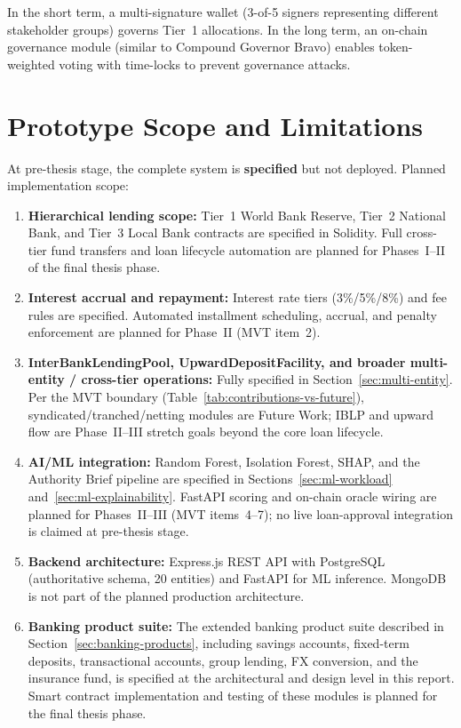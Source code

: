 \documentclass[12pt,a4paper]{report}
\begin{document}
In the short term, a multi-signature wallet (3-of-5 signers representing different stakeholder groups) governs Tier~1 allocations. In the long term, an on-chain governance module (similar to Compound Governor Bravo) enables token-weighted voting with time-locks to prevent governance attacks.

\section{Prototype Scope and Limitations}

At pre-thesis stage, the complete system is \textbf{specified} but not deployed. Planned implementation scope:

\begin{enumerate}[noitemsep]
\item \textbf{Hierarchical lending scope:} Tier~1 World Bank Reserve, Tier~2 National Bank, and Tier~3 Local Bank contracts are specified in Solidity. Full cross-tier fund transfers and loan lifecycle automation are planned for Phases~I--II of the final thesis phase.

\item \textbf{Interest accrual and repayment:} Interest rate tiers (3\%/5\%/8\%) and fee rules are specified. Automated installment scheduling, accrual, and penalty enforcement are planned for Phase~II (MVT item~2).

\item \textbf{InterBankLendingPool, UpwardDepositFacility, and broader multi-entity / cross-tier operations:} Fully specified in Section~\ref{sec:multi-entity}. Per the MVT boundary (Table~\ref{tab:contributions-vs-future}), syndicated/tranched/netting modules are Future Work; IBLP and upward flow are Phase~II--III stretch goals beyond the core loan lifecycle.

\item \textbf{AI/ML integration:} Random Forest, Isolation Forest, SHAP, and the Authority Brief pipeline are specified in Sections~\ref{sec:ml-workload} and~\ref{sec:ml-explainability}. FastAPI scoring and on-chain oracle wiring are planned for Phases~II--III (MVT items~4--7); no live loan-approval integration is claimed at pre-thesis stage.

\item \textbf{Backend architecture:} Express.js REST API with PostgreSQL (authoritative schema, 20 entities) and FastAPI for ML inference. MongoDB is not part of the planned production architecture.

\item \textbf{Banking product suite:} The extended banking product suite described in Section~\ref{sec:banking-products}, including savings accounts, fixed-term deposits, transactional accounts, group lending, FX conversion, and the insurance fund, is specified at the architectural and design level in this report. Smart contract implementation and testing of these modules is planned for the final thesis phase.
\end{enumerate}
\end{document}

